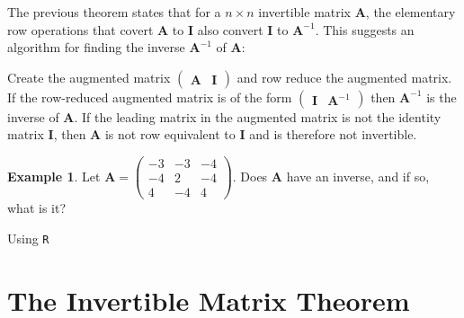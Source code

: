\documentclass[
]{book}
\theoremstyle{definition}
\theoremstyle{definition}
\newtheorem{example}{Example}[chapter]
\theoremstyle{definition}
\theoremstyle{definition}
\theoremstyle{remark}
\begin{document}
The previous theorem states that for a \(n \times n\) invertible matrix \(\mathbf{A}\), the elementary row operations that covert \(\mathbf{A}\) to \(\mathbf{I}\) also convert \(\mathbf{I}\) to \(\mathbf{A}^{-1}\). This suggests an algorithm for finding the inverse \(\mathbf{A}^{-1}\) of \(\mathbf{A}\):

Create the augmented matrix \(\begin{pmatrix} \mathbf{A} & \mathbf{I} \end{pmatrix}\) and row reduce the augmented matrix. If the row-reduced augmented matrix is of the form \(\begin{pmatrix} \mathbf{I} & \mathbf{A}^{-1} \end{pmatrix}\) then \(\mathbf{A}^{-1}\) is the inverse of \(\mathbf{A}\). If the leading matrix in the augmented matrix is not the identity matrix \(\mathbf{I}\), then \(\mathbf{A}\) is not row equivalent to \(\mathbf{I}\) and is therefore not invertible.

\begin{example}
Let \(\mathbf{A} = \begin{pmatrix} -3 & -3 & -4 \\ -4 & 2 & -4 \\ 4 & -4 & 4 \end{pmatrix}\). Does \(\mathbf{A}\) have an inverse, and if so, what is it?

Using \texttt{R}
\end{example}

\hypertarget{the-invertible-matrix-theorem}{%
\section{The Invertible Matrix Theorem}\label{the-invertible-matrix-theorem}}
\end{document}
